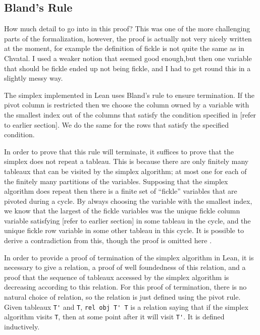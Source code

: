 \documentclass[11pt]{article} %
\begin{document}
\subsection{Bland's Rule}\label{section:bland}

\color{red}
How much detail to go into in this proof? This was one of the more challenging parts of the formalization, however, the proof is actually not very nicely written at the moment, for example the definition of fickle is not quite the same as in Chvatal. I used a weaker notion that seemed good enough,but then one variable that should be fickle ended up not being fickle, and I had to get round this in a slightly messy way.
\color{black}

The simplex implemented in Lean uses Bland's rule to ensure termination. If the pivot column is restricted then we choose the column owned by a variable with the smallest index out of the columns that satisfy the condition specified in [refer to earlier section]. We do the same for the rows that satisfy the specified condition.

In order to prove that this rule will terminate, it suffices to prove that the simplex does not repeat a tableau. This is because there are only finitely many tableaux that can be visited by the simplex algorithm; at most one for each of the finitely many partitions of the variables. Supposing that the simplex algorithm does repeat then there is a finite set of ``fickle'' variables that are pivoted during a cycle. By always choosing the variable with the smallest index, we know that the largest of the fickle variables was the unique fickle column variable satisfying [refer to earlier section] in some tableau in the cycle, and the unique fickle row variable in some other tableau in this cycle. It is possible to derive a contradiction from this, though the proof is omitted here \cite{Chvatal}.

In order to provide a proof of termination of the simplex algorithm in Lean, it is necessary to give a relation, a proof of well foundedness of this relation, and a proof that the sequence of tableaux accessed by the simplex algorithm is decreasing according to this relation. For this proof of termination, there is no natural choice of relation, so the relation is just defined using the pivot rule. Given tableaux \lstinline|T'| and \lstinline|T|, \lstinline|rel obj T' T| is a relation saying that if the simplex algorithm visits \lstinline|T|, then at some point after it will visit \lstinline|T'|. It is defined inductively.
\end{document}
